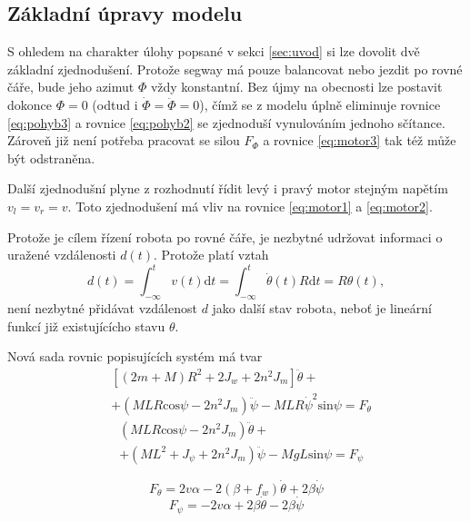 \documentclass[conference]{IEEEtran}
\begin{document}
\subsection{Základní úpravy modelu}
S ohledem na charakter úlohy popsané v sekci \ref{sec:uvod} si lze dovolit dvě základní zjednodušení. Protože segway
má pouze balancovat nebo jezdit po rovné čáře, bude jeho azimut $\varPhi$ vždy konstantní. 
Bez újmy na obecnosti lze postavit dokonce $\varPhi = 0$ (odtud i $\dot{\varPhi} = \ddot{\varPhi} = 0$),
čímž se z modelu úplně eliminuje rovnice \eqref{eq:pohyb3}
a rovnice \eqref{eq:pohyb2} se zjednoduší vynulováním jednoho sčítance. Zároveň již není potřeba pracovat se silou $F_\varPhi$
a rovnice \eqref{eq:motor3} tak též může být odstraněna.

Další zjednodušní plyne z rozhodnutí řídit levý i pravý motor stejným napětím $v_l = v_r = v$.
Toto zjednodušení má vliv na rovnice \eqref{eq:motor1} a \eqref{eq:motor2}.

Protože je cílem řízení robota po rovné čáře, je nezbytné udržovat informaci o uražené vzdálenosti $d(t)$.
Protože platí vztah 
\begin{equation}
    d(t) = \int_{-\infty}^t v(t) \text{d}t = \int_ {-\infty}^t \dot{\theta}(t) R \text{d}t = R \theta(t),
    \label{eq:vzdalenost}
\end{equation}
není nezbytné přidávat vzdálenost $d$ jako další stav robota, neboť je lineární funkcí již existujícícho stavu $\theta$.

Nová sada rovnic popisujících systém má tvar
\begin{equation}
    \begin{aligned}
        &\left[(2m + M) R^2 + 2 J_w + 2n^2 J_m\right] \ddot{\theta} + \\
        &+ (MLR \text{cos} \psi - 2n^2 J_m) \ddot{\psi} - MLR\dot{\psi}^2 \text{sin} \psi = F_\theta
    \end{aligned}
    \label{eq:pohyb1_easy}
\end{equation}
\begin{equation}
    \begin{aligned}
        & (MLR \text{cos} \psi - 2n^2 J_m) \ddot{\theta} + \\
        & + (ML^2 + J_\psi + 2n^2 J_m) \ddot{\psi} - MgL\text{sin}\psi = F_\psi
    \end{aligned}
    \label{eq:pohyb2_easy}
\end{equation}

\begin{equation}
    F_\theta = 2v \alpha - 2(\beta + f_w) \dot{\theta} + 2\beta\dot{\psi}
    \label{eq:motor1_easy}
\end{equation}
\begin{equation}
    F_\psi = - 2v \alpha + 2\beta \dot{\theta} - 2\beta \dot{\psi}
    \label{eq:motor2_easy}
\end{equation}
\end{document}
